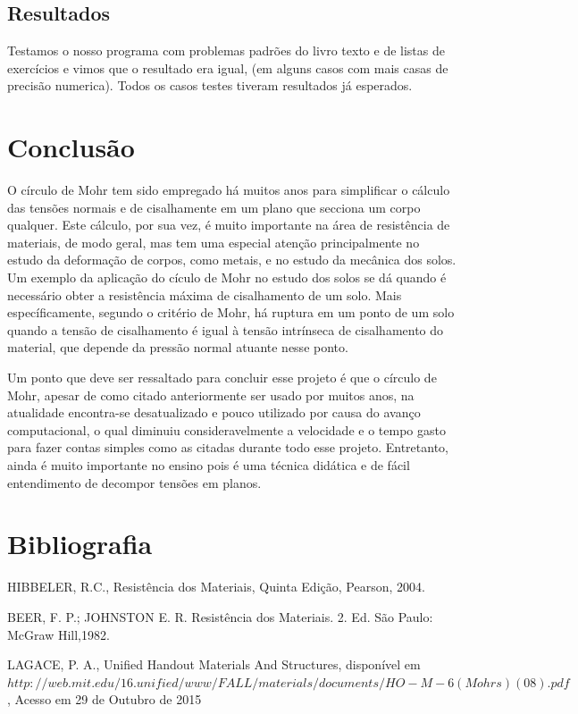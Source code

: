 \documentclass[a4paper]{article}
\begin{document}
\subsection{Resultados}
Testamos o nosso programa com problemas padrões do livro texto e de listas de exercícios e vimos que o resultado era igual, (em alguns casos com mais casas de precisão numerica). Todos os casos testes tiveram resultados já esperados.

\section{Conclusão}

O círculo de Mohr tem sido empregado há muitos anos para simplificar o cálculo das tensões normais e de cisalhamente em um plano que secciona um corpo qualquer. Este cálculo, por sua vez, é muito importante na área de resistência de materiais, de modo geral, mas tem uma especial atenção principalmente no estudo da deformação de corpos, como metais, e no estudo da mecânica dos solos. Um exemplo da aplicação do cículo de Mohr no estudo dos solos se dá quando é necessário obter a resistência máxima de cisalhamento de um solo. Mais específicamente, segundo o critério de Mohr, há ruptura em um ponto de um solo quando a tensão de cisalhamento é igual à tensão intrínseca de cisalhamento do material, que depende da pressão normal atuante nesse ponto.

Um ponto que deve ser ressaltado para concluir esse projeto é que o círculo de Mohr, apesar de como citado anteriormente ser usado por muitos anos, na atualidade encontra-se desatualizado e pouco utilizado por causa do avanço computacional, o qual diminuiu consideravelmente a velocidade e o tempo gasto para fazer contas simples como as citadas durante todo esse projeto. Entretanto, ainda é muito importante no ensino pois é uma técnica didática e de fácil entendimento de decompor tensões em planos.

\section{Bibliografia}

HIBBELER, R.C., Resistência dos Materiais, Quinta Edição, Pearson, 2004.

BEER, F. P.; JOHNSTON E. R. Resistência dos Materiais. 2. Ed. São Paulo: McGraw Hill,1982.

LAGACE, P. A., Unified Handout Materials And Structures, disponível em $http://web.mit.edu/16.unified/www/FALL/materials/documents/HO-M-6(Mohrs)(08).pdf$, Acesso em 29 de Outubro de 2015
\end{document}
